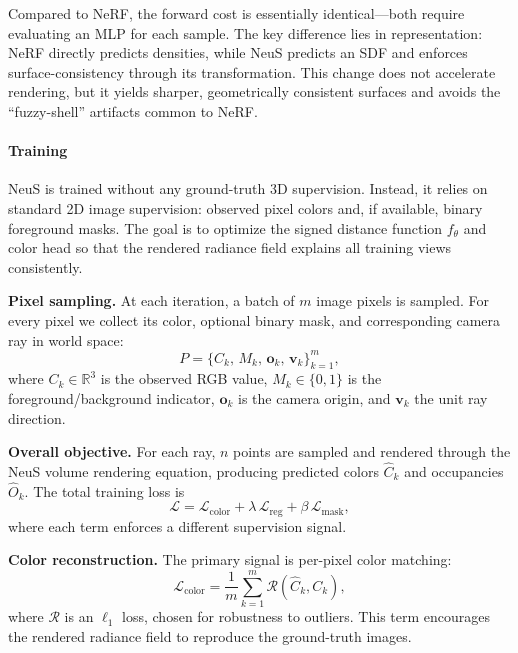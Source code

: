 \begin{enrichment}
\begin{enrichment}
        Compared to NeRF, the forward cost is essentially identical—both require evaluating an MLP for each 
        sample. The key difference lies in representation: NeRF directly predicts densities, while NeuS 
        predicts an SDF and enforces surface-consistency through its transformation. This change does not 
        accelerate rendering, but it yields sharper, geometrically consistent surfaces and avoids the 
        “fuzzy-shell” artifacts common to NeRF.
        
        \paragraph{Training} 
        NeuS is trained without any ground-truth 3D supervision. Instead, it relies on standard 2D image supervision: observed pixel colors and, if available, binary foreground masks. The goal is to optimize the signed distance function \( f_\theta \) and color head so that the rendered radiance field explains all training views consistently.  
        
        \medskip
        \noindent\textbf{Pixel sampling.}  
        At each iteration, a batch of \(m\) image pixels is sampled. For every pixel we collect its color, optional binary mask, and corresponding camera ray in world space:
        \[
        P = \{ C_k, \, M_k, \, \mathbf{o}_k, \, \mathbf{v}_k \}_{k=1}^m,
        \]
        where \( C_k \in \mathbb{R}^3 \) is the observed RGB value, 
        \( M_k \in \{0,1\} \) is the foreground/background indicator, 
        \(\mathbf{o}_k\) is the camera origin, and \(\mathbf{v}_k\) the unit ray direction.
        
        \medskip
        \noindent\textbf{Overall objective.}  
        For each ray, \(n\) points are sampled and rendered through the NeuS volume rendering equation, producing predicted colors \(\hat{C}_k\) and occupancies \(\hat{O}_k\). The total training loss is
        \begin{equation}
            \mathcal{L} = \mathcal{L}_{\text{color}} 
            + \lambda \, \mathcal{L}_{\text{reg}}
            + \beta \, \mathcal{L}_{\text{mask}}, 
        \end{equation}
        where each term enforces a different supervision signal.
        
        \medskip
        \noindent\textbf{Color reconstruction.}  
        The primary signal is per-pixel color matching:
        \begin{equation}
            \mathcal{L}_{\text{color}} = 
            \frac{1}{m} \sum_{k=1}^m 
            \mathcal{R}(\hat{C}_k, C_k),
        \end{equation}
        where \(\mathcal{R}\) is an \(\ell_1\) loss, chosen for robustness to outliers. This term encourages the rendered radiance field to reproduce the ground-truth images.
        

\end{enrichment}
\end{enrichment}
